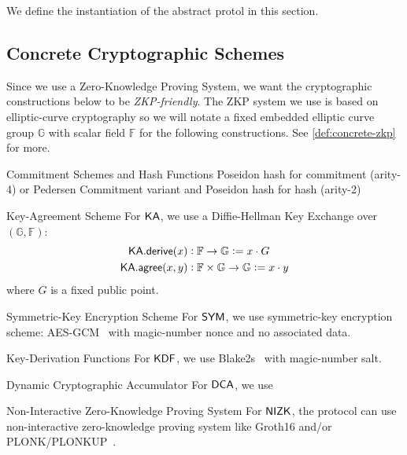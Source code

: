 
We define the instantiation of the abstract protol in this section.

\subsection{Concrete Cryptographic Schemes}

Since we use a Zero-Knowledge Proving System, we want the cryptographic constructions below to be \emph{ZKP-friendly}. The ZKP system we use is based on elliptic-curve cryptography so we will notate a fixed embedded elliptic curve group $\mathbb{G}$ with scalar field $\mathbb{F}$ for the following constructions. See \autoref{def:concrete-zkp} for more.

\begin{definitiontoc}{Commitment Schemes and Hash Functions}
    Poseidon hash \cite{KRRS21USENIX} for \UTXO{} commitment (arity-4) or Pedersen Commitment variant and Poseidon hash for \VN{} hash (arity-2)
\end{definitiontoc}

\begin{definitiontoc}{Key-Agreement Scheme}
    For ${\textsf{KA}}$, we use a Diffie-Hellman Key Exchange over $(\mathbb{G}, \mathbb{F})$:
    \begin{align*}
        {\textsf{KA}}.{\textsf{derive}}(x)   &: \mathbb{F} \to \mathbb{G}                   := x \cdot G \\
        {\textsf{KA}}.{\textsf{agree}}(x, y) &: \mathbb{F} \times \mathbb{G} \to \mathbb{G} := x \cdot y
    \end{align*}
    where $G$ is a fixed public point.
\end{definitiontoc}

\begin{definitiontoc}{Symmetric-Key Encryption Scheme}
    For ${\textsf{SYM}}$, we use symmetric-key encryption scheme: AES-GCM~\cite{rfc5288} with magic-number nonce and no associated data.
\end{definitiontoc}

\begin{definitiontoc}{Key-Derivation Functions}
    For ${\textsf{KDF}}$, we use Blake2s~\cite{rfc7693} with magic-number salt.
\end{definitiontoc}

\begin{definitiontoc}{Dynamic Cryptographic Accumulator}
    For ${\textsf{DCA}}$, we use

\end{definitiontoc}

\begin{definitiontoc}{Non-Interactive Zero-Knowledge Proving System} \label{def:concrete-zkp}
    For ${\textsf{NIZK}}$, the protocol can use non-interactive zero-knowledge proving system like Groth16 \cite{KRRS21USENIX} and/or PLONK/PLONKUP~\cite{plonk,plonkup}. 
\end{definitiontoc}

